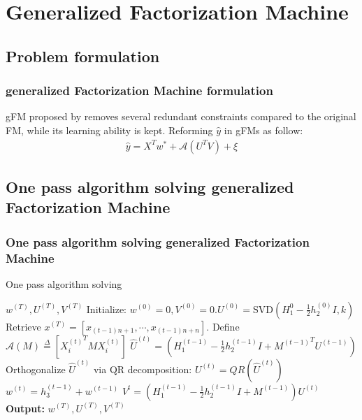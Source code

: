 \documentclass{beamer}
\begin{document}
\section{Generalized Factorization Machine}
\subsection{Problem formulation}
\begin{frame}
\frametitle{generalized Factorization Machine formulation}

	
gFM proposed by \cite{lin2016non} removes several redundant constraints compared to the original FM, while its learning ability is kept. Reforming $\hat{y}$ in gFMs as follow:
\begin{align*}
\hat{y}=X^Tw^*+\mathcal{A}(U^TV)+\xi \label{eq:one_pass_gfm}
\end{align*}

\end{frame}

\subsection{One pass algorithm solving generalized Factorization Machine}
\begin{frame}
\frametitle{One pass algorithm solving generalized Factorization Machine}
	\small \begin{algorithm}[H]
 \caption{One pass algorithm solving}
 \label{algo:alm}
 \begin{algorithmic}[1]
 \ENSURE $\mathit{w}^{(T)}, \mathit{U}^{(T)}, \mathit{V}^{(T)}$
 \STATE Initialize: $\mathit{w}^{(0)}=0, \mathit{V}^{(0)}=0. \mathit{U}^{(0)}=\mathrm{SVD}\left(H_1^{0}-\frac{1}{2}h_2^{(0)}I,k\right)$
     \STATE Retrieve $x^{(T)}=[x_{(t-1)n+1},\cdots,x_{(t-1)n+n}]$. Define $\mathcal{A}(M) \overset{\Delta}{=} \left[{X_i^{(t)}}^TMX_i^{(t)}\right]$
     \STATE $\hat{U}^{(t)}=\left(H_1^{(t-1)}-\frac{1}{2}h_2^{(t-1)}I+{M^{(t-1)}}^TU^{(t-1)}\right)$
     \STATE Orthogonalize $\hat{U}^{(t)}$ via QR decomposition: $U^{(t)}=QR(\hat{U}^{(t)})$  
     \STATE $\mathit{w}^{(t)}=\mathit{h}_3^{(t-1)}+\mathit{w}^{(t-1)}$
     \STATE $\mathit{V}^{t}=(\mathit{H}_1^{(t-1)}-\frac{1}{2}h_2^{(t-1)}I+\mathit{M}^{(t-1)})\mathit{U}^{(t)}$
    \ENDFOR
\STATE \textbf{Output:} $\mathit{w}^{(T)},\mathit{U}^{(T)},\mathit{V}^{(T)}$
 \end{algorithmic}
\end{algorithm}
\end{frame}
\end{document}
